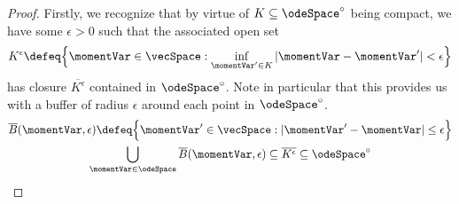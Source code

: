 \begin{proof}
  \label{proof:proposition:compact-ode-existence}
  Firstly, we recognize that by virtue of $K \subseteq \odeSpace^\circ$ being compact, we have some $\epsilon > 0$ such that the associated open set
  \begin{equation}
    K^\epsilon \defeq \Big\{ \momentVar \in \vecSpace : \inf_{\momentVar' \in K} |\momentVar - \momentVar'| < \epsilon \Big\}
  \end{equation}
  has closure $\overline{K^\epsilon}$ contained in $\odeSpace^\circ$.
  Note in particular that this provides us with a buffer of radius $\epsilon$ around each point in $\odeSpace^\circ$.
  \begin{gather}
    \overline B(\momentVar, \epsilon) \defeq \Big\{ \momentVar' \in \vecSpace : |\momentVar' - \momentVar| \leq \epsilon \Big\} \\
    \bigcup_{\momentVar \in \odeSpace} \overline B(\momentVar, \epsilon) \subseteq \overline{K^\epsilon} \subseteq \odeSpace^\circ
  \end{gather}


\end{proof}
